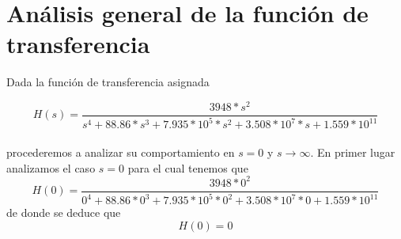 \documentclass[11pt,a4paper]{report}
\author{Marcos}
\begin{document}
\section*{Análisis general de la función de transferencia}

Dada la función de transferencia asignada

\[H(s)=\frac{3948*s^2}{s^4+88.86*s^3+7.935*10^5*s^2+3.508*10^7*s+1.559*10^{11}}\]\\
procederemos a analizar su comportamiento en $s=0$ y $s\longrightarrow\infty$.
\newline
\bigskip
En primer lugar analizamos el caso $s=0$ para el cual tenemos que 
\[H(0) = \frac{3948*0^2}{0^4+88.86*0^3+7.935*10^5*0^2+3.508*10^7*0+1.559*10^{11}}\]
de donde se deduce que
\[H(0) = 0\]
\end{document}
